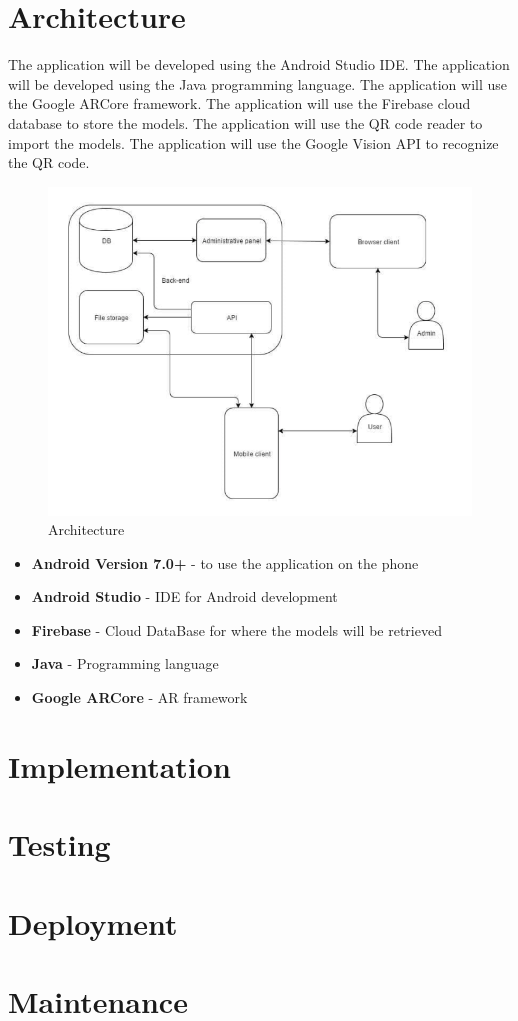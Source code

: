 \section{Architecture}
The application will be developed using the Android Studio IDE. The application will be developed using the Java programming language. The application will use the Google ARCore framework. The application will use the Firebase cloud database to store the models. The application will use the QR code reader to import the models. The application will use the Google Vision API to recognize the QR code.
\begin{figure}
    \begin{center}
        \includegraphics{img/architecture.png}
        \caption{Architecture}
        \label{fig:architecture}
    \end{center}
\end{figure}

\begin{itemize}
    \item \textbf{Android Version 7.0+} - to use the application on the phone
    \item \textbf{Android Studio} - IDE for Android development
    \item \textbf{Firebase} - Cloud DataBase for where the models will be retrieved
    \item \textbf{Java} - Programming language
    \item \textbf{Google ARCore} - AR framework
\end{itemize}

\section{Implementation}

\section{Testing}

\section{Deployment}

\section{Maintenance}

